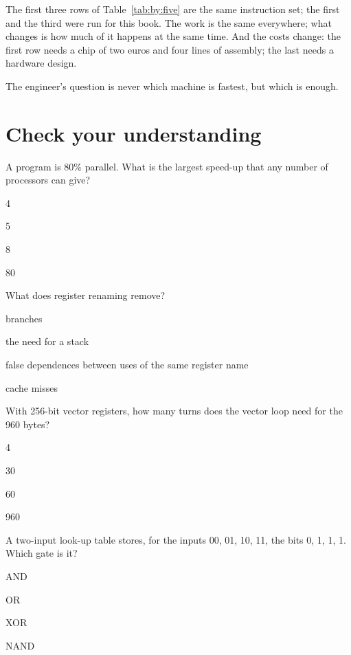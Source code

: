The first three rows of Table~\ref{tab:by:five} are the same instruction set;
the first and the third were run for this book. The work is the same
everywhere; what changes is how much of it happens at the same time. And the
costs change: the first row needs a chip of two euros and four lines of
assembly; the last needs a hardware design.

\begin{prgconcept}
The engineer's question is never which machine is fastest, but which is
enough.
\end{prgconcept}





\section{Check your understanding}

\begin{quiz}{A program is 80\% parallel. What is the largest speed-up that any number of processors can give?}
\item 4
\item 5
\item 8
\item 80
\end{quiz}

\begin{quiz}{What does register renaming remove?}
\item branches
\item the need for a stack
\item false dependences between uses of the same register name
\item cache misses
\end{quiz}

\begin{quiz}{With 256-bit vector registers, how many turns does the vector loop need for the 960 bytes?}
\item 4
\item 30
\item 60
\item 960
\end{quiz}

\begin{quiz}{A two-input look-up table stores, for the inputs 00, 01, 10, 11, the bits 0, 1, 1, 1. Which gate is it?}
\item AND
\item OR
\item XOR
\item NAND
\end{quiz}


